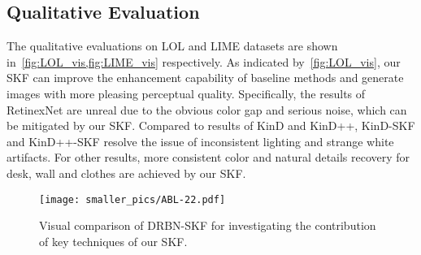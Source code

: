 \documentclass[10pt,twocolumn,letterpaper]{article}
\begin{document}
\vspace{-0.2cm}
\subsection{Qualitative Evaluation}
\vspace{-0.2cm}
The qualitative evaluations on LOL and LIME datasets are shown in~\cref{fig:LOL_vis,fig:LIME_vis} respectively. As indicated by~\cref{fig:LOL_vis}, our SKF can improve the enhancement capability of baseline methods and generate images with more pleasing perceptual quality. Specifically, the results of RetinexNet are unreal due to the obvious color gap and serious noise, which can be mitigated by our SKF. Compared to results of KinD and KinD++, KinD-SKF and KinD++-SKF resolve the issue of inconsistent lighting and strange white artifacts. For other results, more consistent color and natural details recovery for desk, wall and clothes are achieved by our SKF.

\begin{figure*}[ht]
  \centering
  \texttt{[image: smaller\_pics/ABL-22.pdf]}
  \setlength{\abovecaptionskip}{-0.3cm}
  \setlength{\belowcaptionskip}{-0.2cm}
  \caption{Visual comparison of DRBN-SKF for investigating the contribution of key techniques of our SKF.}
  \label{fig:abl_vis}
\end{figure*}
\end{document}
